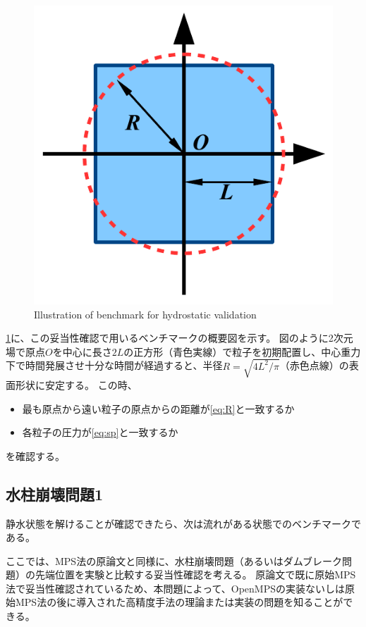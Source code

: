 		\begin{figure} \centering
			\includegraphics[width=.8 \linewidth, clip]{img/centralgravity.pdf}
			\caption{Illustration of benchmark for hydrostatic validation \label{fig:centralgravity}}
		\end{figure}
		\cref{fig:centralgravity}に、この妥当性確認で用いるベンチマークの概要図を示す。
		図のように2次元場で原点$O$を中心に長さ$2L$の正方形（青色実線）で粒子を初期配置し、中心重力下で時間発展させ十分な時間が経過すると、半径$R=\sqrt{4L^2/\pi}$（赤色点線）の表面形状に安定する。
		この時、
		\begin{itemize}
			\item 最も原点から遠い粒子の原点からの距離が\cref{eq:R}と一致するか
			\item 各粒子の圧力が\cref{eq:sp}と一致するか
		\end{itemize}
		を確認する。

	\subsection{水柱崩壊問題1 \label{subsec:dambreak1}}
		静水状態を解けることが確認できたら、次は流れがある状態でのベンチマークである。

		ここでは、MPS法の原論文\Cite{ref:mps}と同様に、水柱崩壊問題（あるいはダムブレーク問題）の先端位置を実験と比較する妥当性確認を考える。
		原論文で既に原始MPS法で妥当性確認されているため、本問題によって、OpenMPSの実装ないしは原始MPS法の後に導入された高精度手法の理論または実装の問題を知ることができる。

